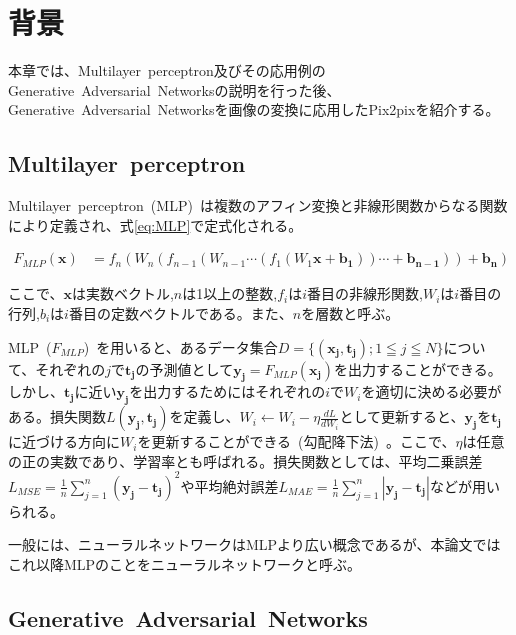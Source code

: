 \chapter{背景}

本章では、Multilayer~perceptron及びその応用例のGenerative~Adversarial~Networksの説明を行った後、Generative~Adversarial~Networksを画像の変換に応用したPix2pixを紹介する。

\section{Multilayer~perceptron}

Multilayer~perceptron~(MLP)~は複数のアフィン変換と非線形関数からなる関数により定義され、式\ref{eq:MLP}で定式化される。

\begin{align}
    \label{eq:MLP}
    F_{MLP}(\boldsymbol{x})&=f_{n}(W_{n}(f_{n-1}(W_{n-1}\cdots(f_{1}(W_{1}\boldsymbol{x}+\boldsymbol{b_{1}}))\cdots+\boldsymbol{b_{n-1}}))+\boldsymbol{b_{n}})
\end{align}

ここで、$\boldsymbol{x}$は実数ベクトル,$n$は1以上の整数,$f_{i}$は$i$番目の非線形関数,$W_{i}$は$i$番目の行列,$b_{i}$は$i$番目の定数ベクトルである。また、$n$を層数と呼ぶ。

MLP~($F_{MLP}$)~を用いると、あるデータ集合$D=\{(\boldsymbol{x_j},\boldsymbol{t_j}); 1 \leqq j \leqq N\}$について、それぞれの$j$で$\boldsymbol{t_{j}}$の予測値として$\boldsymbol{y_j}=F_{MLP}(\boldsymbol{x_j})$を出力することができる。しかし、$\boldsymbol{t_j}$に近い$\boldsymbol{y_j}$を出力するためにはそれぞれの$i$で$W_i$を適切に決める必要がある。損失関数$L(\boldsymbol{y_j},\boldsymbol{t_j})$を定義し、$W _i \leftarrow W_i - \eta \frac{d L}{dW_i}$として更新すると、$\boldsymbol{y_j}$を$\boldsymbol{t_j}$に近づける方向に$W_i$を更新することができる~(勾配降下法)~。ここで、$\eta$は任意の正の実数であり、学習率とも呼ばれる。損失関数としては、平均二乗誤差$L_{MSE}=\frac{1}{n}\sum _{j=1} ^{n} {(\boldsymbol{y_j} - \boldsymbol{t_j})^2}$や平均絶対誤差$L_{MAE}=\frac{1}{n}\sum _{j=1} ^{n} {|\boldsymbol{y_j} - \boldsymbol{t_j}|}$などが用いられる。

一般には、ニューラルネットワークはMLPより広い概念であるが、本論文ではこれ以降MLPのことをニューラルネットワークと呼ぶ。

\section{Generative~Adversarial~Networks}

